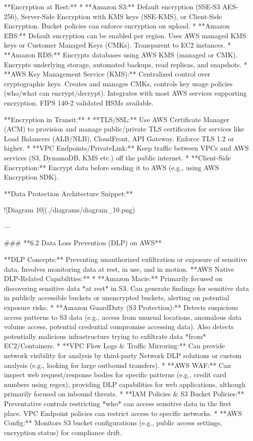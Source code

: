 \documentclass{article}
\begin{document}
**Encryption at Rest:**
* **Amazon S3:** Default encryption (SSE-S3 AES-256), Server-Side Encryption with KMS keys (SSE-KMS), or Client-Side Encryption. Bucket policies can enforce encryption on upload.
* **Amazon EBS:** Default encryption can be enabled per region. Uses AWS managed KMS keys or Customer Managed Keys (CMKs). Transparent to EC2 instances.
* **Amazon RDS:** Encrypts databases using AWS KMS (managed or CMK). Encrypts underlying storage, automated backups, read replicas, and snapshots.
* **AWS Key Management Service (KMS):** Centralized control over cryptographic keys. Creates and manages CMKs, controls key usage policies (who/what can encrypt/decrypt). Integrates with most AWS services supporting encryption. FIPS 140-2 validated HSMs available.

**Encryption in Transit:**
* **TLS/SSL:** Use AWS Certificate Manager (ACM) to provision and manage public/private TLS certificates for services like Load Balancers (ALB/NLB), CloudFront, API Gateway. Enforce TLS 1.2 or higher.
* **VPC Endpoints/PrivateLink:** Keep traffic between VPCs and AWS services (S3, DynamoDB, KMS etc.) off the public internet.
* **Client-Side Encryption:** Encrypt data before sending it to AWS (e.g., using AWS Encryption SDK).

**Data Protection Architecture Snippet:**


![Diagram 10](./diagrams/diagram_10.png)



---

### **6.2 Data Loss Prevention (DLP) on AWS**

**DLP Concepts:** Preventing unauthorized exfiltration or exposure of sensitive data. Involves monitoring data at rest, in use, and in motion.
**AWS Native DLP-Related Capabilities:**
* **Amazon Macie:** Primarily focused on discovering sensitive data *at rest* in S3. Can generate findings for sensitive data in publicly accessible buckets or unencrypted buckets, alerting on potential exposure risks.
* **Amazon GuardDuty (S3 Protection):** Detects suspicious access patterns to S3 data (e.g., access from unusual locations, anomalous data volume access, potential credential compromise accessing data). Also detects potentially malicious infrastructure trying to exfiltrate data *from* EC2/Containers.
* **VPC Flow Logs & Traffic Mirroring:** Can provide network visibility for analysis by third-party Network DLP solutions or custom analysis (e.g., looking for large outbound transfers).
* **AWS WAF:** Can inspect web request/response bodies for specific patterns (e.g., credit card numbers using regex), providing DLP capabilities for web applications, although primarily focused on inbound threats.
* **IAM Policies & S3 Bucket Policies:** Preventative controls restricting *who* can access sensitive data in the first place. VPC Endpoint policies can restrict access to specific networks.
* **AWS Config:** Monitors S3 bucket configurations (e.g., public access settings, encryption status) for compliance drift.
\end{document}
